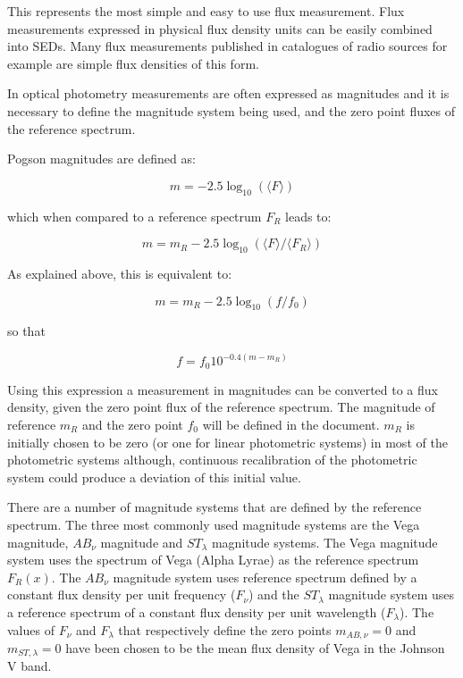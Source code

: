 \documentclass[11pt,a4paper]{ivoa}
\begin{document}
This represents the most simple and easy to use flux measurement. Flux
measurements expressed in physical flux density units can be easily combined
into SEDs. Many flux measurements published in catalogues of radio sources
for example are simple flux densities of this form.
\par

In optical photometry measurements are often expressed as magnitudes and it
is necessary to define the magnitude system being used, and the zero point
fluxes of the reference spectrum.
\par

Pogson magnitudes are defined as:

\begin{equation} \label{eq:4}
m = -2.5\log_{10} (\langle F\rangle )
\end{equation}

which when compared to a reference spectrum $F_R$ leads to:

\begin{equation} \label{eq:5}
m = m_R -2.5 \log_{10} \left(\langle F\rangle /\langle F_R \rangle \right)
\end{equation}

As explained above, this is equivalent to:

\begin{equation} \label{eq:6}
m = m_R - 2.5 \log_{10} (f/f_0 )
\end{equation}


so that

\begin{equation} \label{eq:7}
f = f_0 10^{-0.4(m - m_{R})}
\end{equation}


Using this expression a measurement in magnitudes can be converted to a
flux density, given the zero point flux of the reference spectrum.  The
magnitude of reference $m_{R}$ and the zero point $f_0$ will be defined
in the document. $m_{R}$ is initially chosen to be zero (or one for
linear photometric systems) in most of the photometric systems although,
continuous recalibration of the photometric system could
produce a deviation of this initial value.
\par

There are a number of magnitude systems that are defined by the reference
spectrum. The three most commonly used magnitude systems are the Vega
magnitude, $AB_{\nu }$ magnitude and $ST_{\lambda }$ magnitude systems.
The Vega magnitude system uses the spectrum of Vega (Alpha Lyrae) as the
reference spectrum $F_R (x)$. The $AB_{\nu }$ magnitude system uses
reference spectrum defined by a constant flux density per unit frequency
($F_{\nu }$) and the
$ST_{\lambda }$ magnitude system uses a reference spectrum of a constant
flux density per unit wavelength ($F_{\lambda }$). The values of $F_{\nu }$
and $F_{\lambda }$ that respectively define the zero points
$m_{AB,\nu } =0$ and
$m_{ST,\lambda } =0$ have been chosen to be the mean flux density of
Vega in the Johnson V band.
\end{document}
